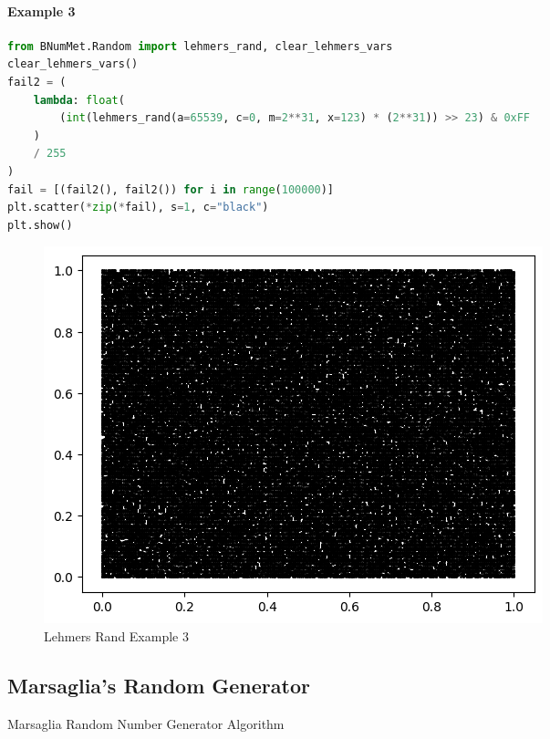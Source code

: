 \paragraph{Example 3}{
\begin{lstlisting}[language=Python]
from BNumMet.Random import lehmers_rand, clear_lehmers_vars
clear_lehmers_vars()
fail2 = (
    lambda: float(
        (int(lehmers_rand(a=65539, c=0, m=2**31, x=123) * (2**31)) >> 23) & 0xFF
    )
    / 255
)
fail = [(fail2(), fail2()) for i in range(100000)]
plt.scatter(*zip(*fail), s=1, c="black")
plt.show()
\end{lstlisting}
\begin{figure}[H]
    \centering
    \includegraphics{Include/Images/Thesis/Documentation/Randomness/Lehmers Rand Example 3.png}
    \caption{Lehmers Rand Example 3}
    \label{fig:Lehmers Rand Example 3}
\end{figure}
}

\subsection{Marsaglia's Random Generator}
\begin{algorithm}[H]
\SetAlgoLined
 
 \caption{Marsaglia Random Number Generator Algorithm}
\end{algorithm}

